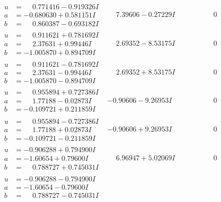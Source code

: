 \documentclass[1p]{elsarticle_modified}
\theoremstyle{definition}
\begin{document}
$$\begin{array}{c|c|c}
\begin{aligned}
u &= \phantom{-}0.771416 - 0.919326 I \\
a &= -0.680630 + 0.581151 I \\
b &= \phantom{-}0.860387 - 0.693182 I\end{aligned}
 & \phantom{-}7.39606 - 0.27229 I & \phantom{-0.000000 } 0 \\ \hline\begin{aligned}
u &= \phantom{-}0.911621 + 0.781692 I \\
a &= \phantom{-}2.37631 + 0.99446 I \\
b &= -1.005870 + 0.894709 I\end{aligned}
 & \phantom{-}2.69352 - 8.53175 I & \phantom{-0.000000 } 0 \\ \hline\begin{aligned}
u &= \phantom{-}0.911621 - 0.781692 I \\
a &= \phantom{-}2.37631 - 0.99446 I \\
b &= -1.005870 - 0.894709 I\end{aligned}
 & \phantom{-}2.69352 + 8.53175 I & \phantom{-0.000000 } 0 \\ \hline\begin{aligned}
u &= \phantom{-}0.955894 + 0.727386 I \\
a &= \phantom{-}1.77188 - 0.02873 I \\
b &= -0.109721 + 0.211859 I\end{aligned}
 & -0.90606 - 9.26953 I & \phantom{-0.000000 } 0 \\ \hline\begin{aligned}
u &= \phantom{-}0.955894 - 0.727386 I \\
a &= \phantom{-}1.77188 + 0.02873 I \\
b &= -0.109721 - 0.211859 I\end{aligned}
 & -0.90606 + 9.26953 I & \phantom{-0.000000 } 0 \\ \hline\begin{aligned}
u &= -0.906288 + 0.794900 I \\
a &= -1.60654 + 0.79600 I \\
b &= \phantom{-}0.788727 + 0.745031 I\end{aligned}
 & \phantom{-}6.96947 + 5.02069 I & \phantom{-0.000000 } 0 \\ \hline\begin{aligned}
u &= -0.906288 - 0.794900 I \\
a &= -1.60654 - 0.79600 I \\
b &= \phantom{-}0.788727 - 0.745031 I\end{aligned}

\end{array}$$
\end{document}
